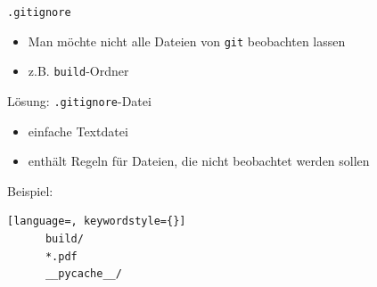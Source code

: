 \begin{frame}[fragile]{\texttt{.gitignore}}
    \begin{itemize}
    \item Man möchte nicht alle Dateien von \texttt{git} beobachten lassen
    \item z.B. \texttt{build}-Ordner
    \end{itemize}
    \begin{center}
        \Large Lösung: \texttt{.gitignore}-Datei
    \end{center}

    \begin{itemize}
    \item einfache Textdatei
    \item enthält Regeln für Dateien, die nicht beobachtet werden sollen
    \end{itemize}
    Beispiel:
    \vspace{1em}
    \begin{lstlisting}[language=, keywordstyle={}]
      build/
      *.pdf
      __pycache__/
    \end{lstlisting}
\end{frame}

